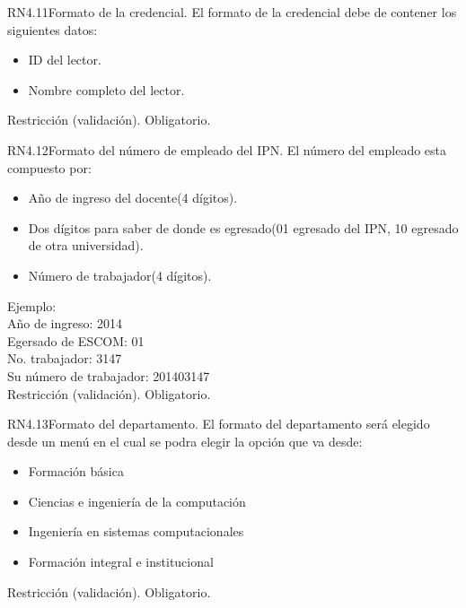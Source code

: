 
\begin{BussinesRule}{RN4.11}{Formato de la credencial.} 
	\BRitem[Descripción:] El formato de la credencial debe de contener los siguientes datos:
		\begin{itemize}	
			\item ID del lector.
			\item Nombre completo del lector.
		\end{itemize}
	\BRitem[Tipo:] Restricción (validación).
	\BRitem[Nivel:] Obligatorio.
\end{BussinesRule}


\begin{BussinesRule}{RN4.12}{Formato del número de empleado del IPN.}
	\BRitem[Descripción:] El número del empleado esta compuesto por:
		\begin{itemize} 
			\item Año de ingreso del docente(4 dígitos).
			\item Dos dígitos para saber de donde es egresado(01 egresado del IPN, 10 egresado de otra universidad).
			\item Número de trabajador(4 dígitos).
		\end{itemize}
	Ejemplo:\\
		Año de ingreso: 2014\\
		Egersado de ESCOM: 01\\
		No. trabajador: 3147\\
		Su número de trabajador: 201403147\\
	\BRitem[Tipo:] Restricción (validación).
	\BRitem[Nivel:] Obligatorio.
\end{BussinesRule}


\begin{BussinesRule}{RN4.13}{Formato del departamento.} 
	\BRitem[Descripción:] El formato del departamento será elegido desde un menú en el cual se podra elegir la opción que va desde:
		\begin{itemize}
			\item Formación básica
			\item Ciencias e ingeniería de la computación
			\item Ingeniería en sistemas computacionales
			\item Formación integral e institucional
		\end{itemize}
	\BRitem[Tipo:] Restricción (validación).
	\BRitem[Nivel:] Obligatorio.
\end{BussinesRule}

